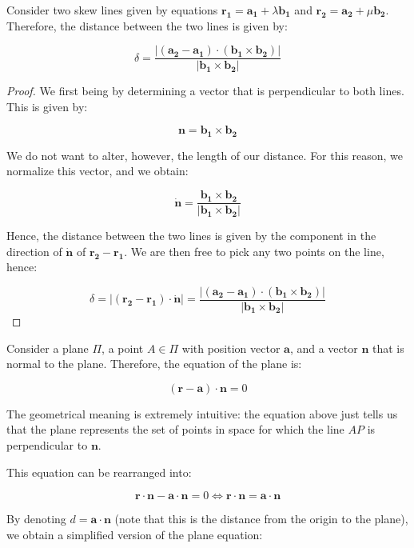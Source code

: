 \documentclass[12pt]{article}
\begin{document}
\begin{proposition}
    Consider two skew lines given by equations $\mathbf{r_1} = \mathbf{a_1} + \lambda\mathbf{b_1}$ and $\mathbf{r_2} = \mathbf{a_2} + \mu\mathbf{b_2}$. Therefore, the distance between the two lines is given by:

    \[ \delta = \frac{|(\mathbf{a_2 - a_1})\cdot(\mathbf{b_1 \times b_2})|}{|\mathbf{b_1 \times b_2}|} \]
\end{proposition}

\begin{proof}
    We first being by determining a vector that is perpendicular to both lines. This is given by:

    \[ \mathbf{n} = \mathbf{b_1 \times b_2} \]

    We do not want to alter, however, the length of our distance. For this reason, we normalize this vector, and we obtain:

    \[ \mathbf{\dot{n}} = \frac{\mathbf{b_1 \times b_2}}{|\mathbf{b_1 \times b_2}|} \]

    Hence, the distance between the two lines is given by the component in the direction of $\mathbf{\dot{n}}$ of $\mathbf{r_2 - r_1}$. We are then free to pick any two points on the line, hence:

    \[ \delta = |\mathbf{(r_2 - r_1) \cdot \dot{n}}| = \frac{|(\mathbf{a_2 - a_1})\cdot(\mathbf{b_1 \times b_2})|}{|\mathbf{b_1 \times b_2}|} \]
\end{proof}

\begin{proposition}
    Consider a plane $\Pi$, a point $A \in \Pi$ with position vector $\mathbf{a}$, and a vector $\mathbf{n}$ that is normal to the plane. Therefore, the equation of the plane is:

    \[ \mathbf{(r - a) \cdot n} = 0 \]

    The geometrical meaning is extremely intuitive: the equation above just tells us that the plane represents the set of points in space for which the line $AP$ is perpendicular to $\mathbf{n}$.
\end{proposition}

This equation can be rearranged into:

\[ \mathbf{r \cdot n - a \cdot n} = 0 \Leftrightarrow \mathbf{r \cdot n = a \cdot n} \]

By denoting $d = \mathbf{a \cdot n}$ (note that this is the distance from the origin to the plane), we obtain a simplified version of the plane equation:
\end{document}
